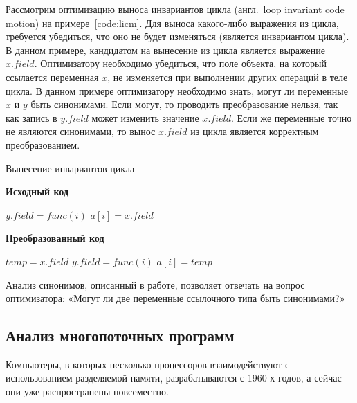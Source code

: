 \documentclass[14pt,titlepage]{extarticle}
\newcommand{\algorithmictitle}[1]{\hspace{8mm}\textbf{#1}}
\newcommand{\eng}[1]{{\English#1}}
\newcommand{\engdef}[1]{(англ.~\eng{#1})}
\begin{document}
      Рассмотрим оптимизацию выноса инвариантов цикла \engdef{loop invariant
      code motion} на примере~\ref{code:licm}.
      Для выноса какого-либо выражения из цикла, требуется убедиться, что оно
      не будет изменяться (является инвариантом цикла).
      В данном примере, кандидатом на вынесение из цикла является выражение
      $x.field$. Оптимизатору необходимо убедиться, что поле объекта, на
      который ссылается переменная $x$, не изменяется при выполнении других
      операций в теле цикла. В данном примере оптимизатору необходимо знать,
      могут ли переменные $x$ и $y$ быть синонимами. Если могут, то
      проводить преобразование нельзя, так как запись в $y.field$ может
      изменить значение $x.field$. Если же переменные точно не являются
      синонимами, то вынос $x.field$ из цикла является корректным
      преобразованием.

      \begin{algorithm}
        \caption{Вынесение инвариантов цикла}
        \label{code:licm}
        \begin{multicols}{2}
          \algorithmictitle{Исходный код}
          \begin{algorithmic}[1]
            \STATE $y.field = func(i)$
            \STATE $a[i] = x.field$
            \ENDFOR
          \end{algorithmic}
          \columnbreak
          \algorithmictitle{Преобразованный код}
          \begin{algorithmic}[1]
            \STATE $temp = x.field$
            \STATE $y.field = func(i)$
            \STATE $a[i] = temp$
            \ENDFOR
          \end{algorithmic}
        \end{multicols}
      \end{algorithm}

      Анализ синонимов, описанный в работе, позволяет отвечать на
      вопрос оптимизатора: «Могут ли две переменные ссылочного типа быть
      синонимами?»

    \subsection{Анализ многопоточных программ}
      \label{section:intro_to_multithreading}

      Компьютеры, в которых несколько процессоров взаимодействуют с
      использованием разделяемой памяти, разрабатываются с 1960-х годов, а
      сейчас они уже распространены повсеместно.
\end{document}
